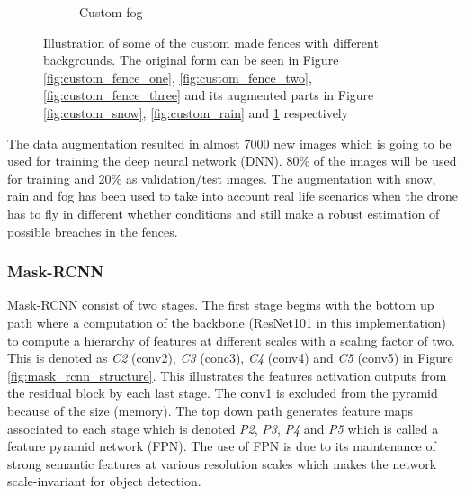 \documentclass[../Head/Main.tex]{subfiles}
\begin{document}
\begin{figure}[H]
\begin{subfigure}{.3\textwidth}
        \caption{Custom fog}
        \label{fig:custom_fog}
    \end{subfigure}
    \caption{Illustration of some of the custom made fences with different backgrounds. The original form can be seen in Figure \ref{fig:custom_fence_one}, \ref{fig:custom_fence_two}, \ref{fig:custom_fence_three} and its augmented parts in Figure \ref{fig:custom_snow}, \ref{fig:custom_rain} and \ref{fig:custom_fog} respectively }
     \label{fig:custom_fences_with_augmentation}
\end{figure}
\vspace{-15pt}
The data augmentation resulted in almost 7000 new images which is going to be used for training the deep neural network (DNN). 80\% of the images will be used for training and 20\% as validation/test images. The augmentation with snow, rain and fog has been used to take into account real life scenarios when the drone has to fly in different whether conditions and still make a robust estimation of possible breaches in the fences. \cite{imgaug}  

\subsubsection*{Mask-RCNN}

Mask-RCNN consist of two stages. The first stage begins with the bottom up path where a computation of the backbone (ResNet101 in this implementation) to compute a hierarchy of features at different scales with a scaling factor of two. This is denoted as \textit{C2} (conv2), \textit{C3} (conc3), \textit{C4} (conv4) and \textit{C5} (conv5) in Figure \ref{fig:mask_rcnn_structure}. This illustrates the features activation outputs from the residual block by each last stage. The conv1 is excluded from the pyramid because of the size (memory). The top down path generates feature maps associated to each stage which is denoted \textit{P2}, \textit{P3}, \textit{P4} and \textit{P5} which is called a feature pyramid network (FPN). The use of FPN is due to its maintenance of strong semantic features at various resolution scales which makes the network scale-invariant for object detection.\cite{FeaturePyramid}
\end{document}
